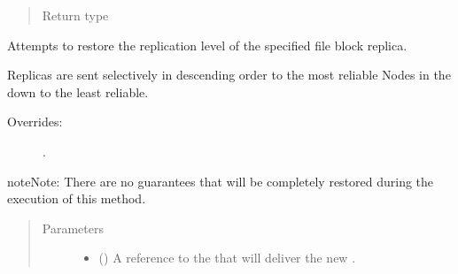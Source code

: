 \documentclass[letterpaper,10pt,english]{sphinxmanual}
\begin{document}
\begin{fulllineitems}
\begin{fulllineitems}
\begin{quote}
\begin{description}
\begin{itemize}
\end{itemize}

\item[{Return type}] \leavevmode
{}

\end{description}\end{quote}

\end{fulllineitems}


\begin{fulllineitems}
\label{\detokenize{app.domain:app.domain.network_nodes.HDFSNode.replicate_part}}
Attempts to restore the replication level of the specified file
block replica.

Replicas are sent selectively in descending order to the
most reliable Nodes in the  down to the least
reliable.
\begin{description}
\item[{Overrides:}] \leavevmode
{\hyperref[\detokenize{app.domain:app.domain.network_nodes.Node.replicate_part}]{}}.

\end{description}

\begin{sphinxadmonition}{note}{Note:}
There are no guarantees that
{\hyperref[\detokenize{app:app.environment_settings.REPLICATION_LEVEL}]{}} will be
completely restored during the execution of this method.
\end{sphinxadmonition}
\begin{quote}\begin{description}
\item[{Parameters}] \leavevmode\begin{itemize}
\item {} 
 ({\hyperref[\detokenize{app:app.type_hints.ClusterType}]{}}) \textendash{} A reference to the
{\hyperref[\detokenize{app.domain:app.domain.cluster_groups.Cluster}]{}} that will
deliver the new .


\end{itemize}
\end{description}
\end{quote}
\end{fulllineitems}
\end{fulllineitems}
\end{document}
